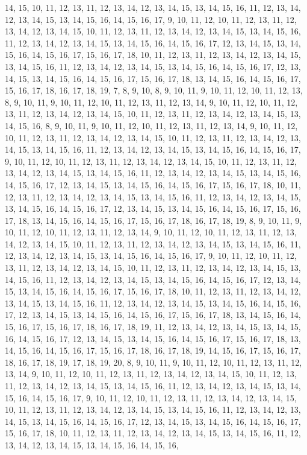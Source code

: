 \begin{DoxyCompactItemize}
14, 15, 10, 11, 12, 13, 11, 12, 13, 14, 12, 13, 14, 15, 13, 14, 15, 16, 11, 12, 13, 14, 12, 13, 14, 15, 13, 14, 15, 16, 14, 15, 16, 17, 9, 10, 11, 12, 10, 11, 12, 13, 11, 12, 13, 14, 12, 13, 14, 15, 10, 11, 12, 13, 11, 12, 13, 14, 12, 13, 14, 15, 13, 14, 15, 16, 11, 12, 13, 14, 12, 13, 14, 15, 13, 14, 15, 16, 14, 15, 16, 17, 12, 13, 14, 15, 13, 14, 15, 16, 14, 15, 16, 17, 15, 16, 17, 18, 10, 11, 12, 13, 11, 12, 13, 14, 12, 13, 14, 15, 13, 14, 15, 16, 11, 12, 13, 14, 12, 13, 14, 15, 13, 14, 15, 16, 14, 15, 16, 17, 12, 13, 14, 15, 13, 14, 15, 16, 14, 15, 16, 17, 15, 16, 17, 18, 13, 14, 15, 16, 14, 15, 16, 17, 15, 16, 17, 18, 16, 17, 18, 19, 7, 8, 9, 10, 8, 9, 10, 11, 9, 10, 11, 12, 10, 11, 12, 13, 8, 9, 10, 11, 9, 10, 11, 12, 10, 11, 12, 13, 11, 12, 13, 14, 9, 10, 11, 12, 10, 11, 12, 13, 11, 12, 13, 14, 12, 13, 14, 15, 10, 11, 12, 13, 11, 12, 13, 14, 12, 13, 14, 15, 13, 14, 15, 16, 8, 9, 10, 11, 9, 10, 11, 12, 10, 11, 12, 13, 11, 12, 13, 14, 9, 10, 11, 12, 10, 11, 12, 13, 11, 12, 13, 14, 12, 13, 14, 15, 10, 11, 12, 13, 11, 12, 13, 14, 12, 13, 14, 15, 13, 14, 15, 16, 11, 12, 13, 14, 12, 13, 14, 15, 13, 14, 15, 16, 14, 15, 16, 17, 9, 10, 11, 12, 10, 11, 12, 13, 11, 12, 13, 14, 12, 13, 14, 15, 10, 11, 12, 13, 11, 12, 13, 14, 12, 13, 14, 15, 13, 14, 15, 16, 11, 12, 13, 14, 12, 13, 14, 15, 13, 14, 15, 16, 14, 15, 16, 17, 12, 13, 14, 15, 13, 14, 15, 16, 14, 15, 16, 17, 15, 16, 17, 18, 10, 11, 12, 13, 11, 12, 13, 14, 12, 13, 14, 15, 13, 14, 15, 16, 11, 12, 13, 14, 12, 13, 14, 15, 13, 14, 15, 16, 14, 15, 16, 17, 12, 13, 14, 15, 13, 14, 15, 16, 14, 15, 16, 17, 15, 16, 17, 18, 13, 14, 15, 16, 14, 15, 16, 17, 15, 16, 17, 18, 16, 17, 18, 19, 8, 9, 10, 11, 9, 10, 11, 12, 10, 11, 12, 13, 11, 12, 13, 14, 9, 10, 11, 12, 10, 11, 12, 13, 11, 12, 13, 14, 12, 13, 14, 15, 10, 11, 12, 13, 11, 12, 13, 14, 12, 13, 14, 15, 13, 14, 15, 16, 11, 12, 13, 14, 12, 13, 14, 15, 13, 14, 15, 16, 14, 15, 16, 17, 9, 10, 11, 12, 10, 11, 12, 13, 11, 12, 13, 14, 12, 13, 14, 15, 10, 11, 12, 13, 11, 12, 13, 14, 12, 13, 14, 15, 13, 14, 15, 16, 11, 12, 13, 14, 12, 13, 14, 15, 13, 14, 15, 16, 14, 15, 16, 17, 12, 13, 14, 15, 13, 14, 15, 16, 14, 15, 16, 17, 15, 16, 17, 18, 10, 11, 12, 13, 11, 12, 13, 14, 12, 13, 14, 15, 13, 14, 15, 16, 11, 12, 13, 14, 12, 13, 14, 15, 13, 14, 15, 16, 14, 15, 16, 17, 12, 13, 14, 15, 13, 14, 15, 16, 14, 15, 16, 17, 15, 16, 17, 18, 13, 14, 15, 16, 14, 15, 16, 17, 15, 16, 17, 18, 16, 17, 18, 19, 11, 12, 13, 14, 12, 13, 14, 15, 13, 14, 15, 16, 14, 15, 16, 17, 12, 13, 14, 15, 13, 14, 15, 16, 14, 15, 16, 17, 15, 16, 17, 18, 13, 14, 15, 16, 14, 15, 16, 17, 15, 16, 17, 18, 16, 17, 18, 19, 14, 15, 16, 17, 15, 16, 17, 18, 16, 17, 18, 19, 17, 18, 19, 20, 8, 9, 10, 11, 9, 10, 11, 12, 10, 11, 12, 13, 11, 12, 13, 14, 9, 10, 11, 12, 10, 11, 12, 13, 11, 12, 13, 14, 12, 13, 14, 15, 10, 11, 12, 13, 11, 12, 13, 14, 12, 13, 14, 15, 13, 14, 15, 16, 11, 12, 13, 14, 12, 13, 14, 15, 13, 14, 15, 16, 14, 15, 16, 17, 9, 10, 11, 12, 10, 11, 12, 13, 11, 12, 13, 14, 12, 13, 14, 15, 10, 11, 12, 13, 11, 12, 13, 14, 12, 13, 14, 15, 13, 14, 15, 16, 11, 12, 13, 14, 12, 13, 14, 15, 13, 14, 15, 16, 14, 15, 16, 17, 12, 13, 14, 15, 13, 14, 15, 16, 14, 15, 16, 17, 15, 16, 17, 18, 10, 11, 12, 13, 11, 12, 13, 14, 12, 13, 14, 15, 13, 14, 15, 16, 11, 12, 13, 14, 12, 13, 14, 15, 13, 14, 15, 16, 14, 15, 16, 
\end{DoxyCompactItemize}

